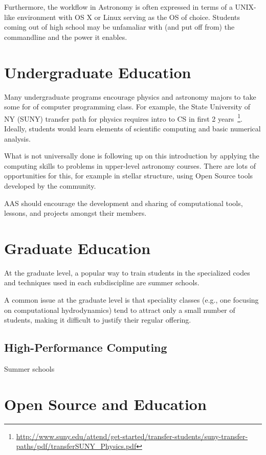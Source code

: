\documentclass[11pt]{article}
\begin{document}
Furthermore, the workflow in Astronomy is often expressed in terms of
a UNIX-like environment with OS X or Linux serving as the OS of
choice.  Students coming out of high school may be unfamaliar with
(and put off from) the commandline and the power it enables.

\section{Undergraduate Education}

Many undergraduate programs encourage physics and astronomy majors to
take some for of computer programming class.  For example, the State
University of NY (SUNY) transfer path for physics requires intro to CS
in first 2
years~\footnote{\url{http://www.suny.edu/attend/get-started/transfer-students/suny-transfer-paths/pdf/transferSUNY_Physics.pdf}}.
Ideally, students would learn elements of scientific computing
and basic numerical analysis.

What is not universally done is following up on this introduction
by applying the computing skills to problems in upper-level
astronomy courses.  There are lots of opportunities for
this, for example in stellar structure, using Open Source
tools developed by the community.

AAS should encourage the development and sharing of computational
tools, lessons, and projects amongst their members.



\section{Graduate Education}

At the graduate level, a popular way to train students in the specialized
codes and techniques used in each subdiscipline are summer schools.

A common issue at the graduate level is that speciality classes (e.g.,
one focusing on computational hydrodynamics) tend to attract only a
small number of students, making it difficult to justify their regular
offering.

\subsection{High-Performance Computing}

Summer schools


\section{Open Source and Education}
\end{document}
